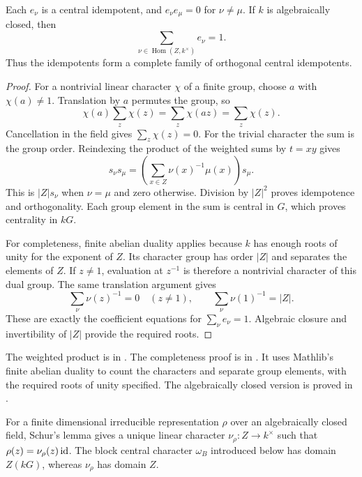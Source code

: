 \begin{proposition}
\label{lib:blocks:character-idempotents}
Each $e_\nu$ is a central idempotent, and $e_\nu e_\mu=0$ for
$\nu\ne\mu$. If $k$ is algebraically closed, then
\[
 \sum_{\nu\in\operatorname{Hom}(Z,k^\times)}e_\nu=1.
\]
Thus the idempotents form a complete family of orthogonal central idempotents.
\end{proposition}
\begin{proof}
For a nontrivial linear character $\chi$ of a finite group, choose $a$
with $\chi(a)\ne1$. Translation by $a$ permutes the group, so
\[
 \chi(a)\sum_z\chi(z)=\sum_z\chi(az)=\sum_z\chi(z).
\]
Cancellation in the field gives $\sum_z\chi(z)=0$. For the trivial
character the sum is the group order. Reindexing the product of the
weighted sums by $t=xy$ gives
\[
 s_\nu s_\mu
 =\left(\sum_{x\in Z}\nu(x)^{-1}\mu(x)\right)s_\mu.
\]
This is $|Z|s_\nu$ when $\nu=\mu$ and zero otherwise. Division by
$|Z|^2$ proves idempotence and orthogonality. Each group element in
the sum is central in $G$, which proves centrality in $kG$.

For completeness, finite abelian duality applies because $k$ has enough
roots of unity for the exponent of $Z$. Its character group has order
$|Z|$ and separates the elements of $Z$. If $z\ne1$, evaluation at
$z^{-1}$ is therefore a nontrivial character of this dual group. The
same translation argument gives
\[
 \sum_\nu\nu(z)^{-1}=0\quad(z\ne1),
 \qquad \sum_\nu\nu(1)^{-1}=|Z|.
\]
These are exactly the coefficient equations for $\sum_\nu e_\nu=1$.
Algebraic closure and invertibility of $|Z|$ provide the required roots.
\end{proof}

\begin{implementation}
The weighted product is
 in
.
The completeness proof is
 in
. It uses Mathlib's finite
abelian duality to count the characters and separate group elements,
with the required roots of unity specified. The algebraically
closed version is proved in
.
\end{implementation}

For a finite dimensional irreducible representation $\rho$ over an
algebraically closed field, Schur's lemma gives a unique linear character
$\nu_\rho:Z\to k^\times$ such that
$\rho(z)=\nu_\rho(z)\operatorname{id}$. The block central character $\omega_B$
introduced below has domain $Z(kG)$, whereas $\nu_\rho$ has domain $Z$.

